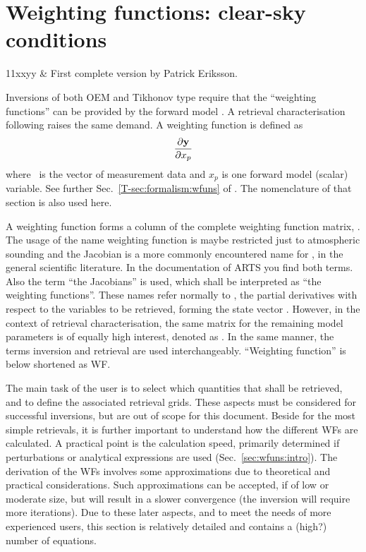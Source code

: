 \chapter{Weighting functions: clear-sky conditions}
 \label{sec:wfuns}

 \starthistory
 11xxyy & First complete version by Patrick Eriksson.\\
 \stophistory

\graphicspath{{Figs/wfuns/}}


Inversions of both OEM and Tikhonov type require that the ``weighting
functions'' can be provided by the forward model \citep[see
e.g.][]{eriksson:analy:00}. A retrieval characterisation following
\citet{rodgers:90,rodgers:00} raises the same demand. A weighting function is
defined as
\begin{equation}
  \frac{\partial \mathbf{y}}{\partial x_p}
  \label{eq:wfuns:ki}
\end{equation}
where \MsrVct\ is the vector of measurement data and $x_p$ is one forward model
(scalar) variable. See further Sec.~\ref{T-sec:formalism:wfuns} of \theory.
The nomenclature of that section is also used here.

A weighting function forms a column of the complete weighting function matrix,
\aWfnMtr{\SttVct}. The usage of the name weighting function is maybe restricted
just to atmospheric sounding and the Jacobian is a more commonly encountered
name for \aWfnMtr{\SttVct}, in the general scientific literature. In the
documentation of ARTS you find both terms. Also the term ``the Jacobians'' is
used, which shall be interpreted as ``the weighting functions''. These names
refer normally to \aWfnMtr{\SttVct}, the partial derivatives with respect to
the variables to be retrieved, forming the state vector \SttVct. However, in
the context of retrieval characterisation, the same matrix for the remaining
model parameters is of equally high interest, denoted as \aWfnMtr{\FrwMdlVct}.
In the same manner, the terms inversion and retrieval are used interchangeably.
``Weighting function'' is below shortened as WF.

The main task of the user is to select which quantities that shall be
retrieved, and to define the associated retrieval grids. These aspects must be
considered for successful inversions, but are out of scope for this document.
Beside for the most simple retrievals, it is further important to understand
how the different WFs are calculated. A practical point is the calculation
speed, primarily determined if perturbations or analytical expressions are used
(Sec.~\ref{sec:wfuns:intro}). The derivation of the WFs involves some
approximations due to theoretical and practical considerations. Such
approximations can be accepted, if of low or moderate size, but will result in
a slower convergence (the inversion will require more iterations). Due to these
later aspects, and to meet the needs of more experienced users, this section is
relatively detailed and contains a (high?) number of equations.

